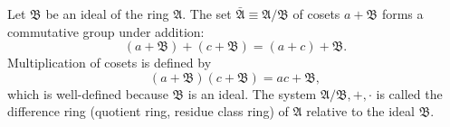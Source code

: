 Let $\mathfrak{B}$ be an ideal of the ring $\mathfrak{A}$. The set $\bar{\mathfrak{A}} \equiv \mathfrak{A}/\mathfrak{B}$ of cosets $a + \mathfrak{B}$ forms a commutative group under addition:
$$(a + \mathfrak{B}) + (c + \mathfrak{B}) = (a + c) + \mathfrak{B}.$$
Multiplication of cosets is defined by
$$(a + \mathfrak{B})(c + \mathfrak{B}) = ac + \mathfrak{B},$$
which is well-defined because $\mathfrak{B}$ is an ideal. The system $\mathfrak{A}/\mathfrak{B}, +, \cdot$ is called the difference ring (quotient ring, residue class ring) of $\mathfrak{A}$ relative to the ideal $\mathfrak{B}$.
